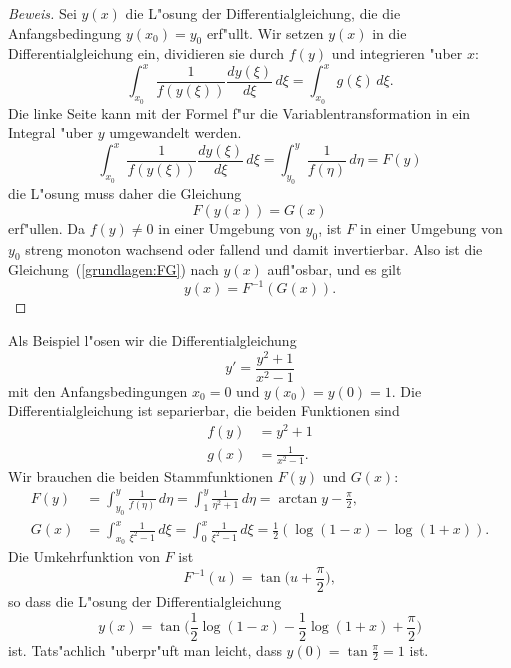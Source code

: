 \begin{proof}[Beweis]
Sei $y(x)$ die L"osung der Differentialgleichung, die die Anfangsbedingung
$y(x_0)=y_0$ erf"ullt.
Wir setzen $y(x)$ in die Differentialgleichung ein,
dividieren sie durch $f(y)$ und integrieren "uber $x$:
\[
\int_{x_0}^x\frac1{f(y(\xi))}\frac{dy(\xi)}{d\xi}\,d\xi
=
\int_{x_0}^x g(\xi)\,d\xi.
\]
Die linke Seite kann mit der Formel f"ur die Variablentransformation in
ein Integral "uber $y$ umgewandelt werden.
\[
\int_{x_0}^x\frac1{f(y(\xi))}\frac{dy(\xi)}{d\xi}\,d\xi
=
\int_{y_0}^y \frac1{f(\eta)}\,d\eta=F(y)
\]
die L"osung muss daher die Gleichung
\begin{equation}
F(y(x))=G(x)
\label{grundlagen:FG}
\end{equation}
erf"ullen.
Da $f(y)\ne 0$ in einer Umgebung von $y_0$, ist $F$ in einer Umgebung von $y_0$
streng monoton wachsend oder fallend und damit invertierbar.
Also ist die Gleichung~(\ref{grundlagen:FG}) nach $y(x)$ aufl"osbar, und
es gilt
\[
y(x)=F^{-1}(G(x)).
\]
\end{proof}

\begin{beispiel}
Als Beispiel l"osen wir die Differentialgleichung
\[
y'=\frac{y^2+1}{x^2-1}
\]
mit den Anfangsbedingungen $x_0=0$ und $y(x_0)=y(0)=1$.
Die Differentialgleichung ist separierbar, die beiden Funktionen sind
\begin{align*}
f(y)&=y^2+1
\\
g(x)&=\frac1{x^2-1}.
\end{align*}
Wir brauchen die beiden Stammfunktionen $F(y)$ und $G(x)$:
\begin{align*}
F(y)
&=
\int_{y_0}^y \frac1{f(\eta)}\,d\eta
=
\int_{1}^y \frac1{\eta^2+1}\,d\eta
=
\arctan y - \frac{\pi}2,
\\
G(x)
&=
\int_{x_0}^x\frac1{\xi^2-1}\,d\xi
=
\int_0^x \frac1{\xi^2-1}\,d\xi
=
\frac12(\log(1-x)-\log(1+x)).
\end{align*}
Die Umkehrfunktion von $F$ ist
\[
F^{-1}(u)=\tan\biggl(u+\frac{\pi}2\biggr),
\]
so dass die L"osung der Differentialgleichung
\[
y(x)=
\tan\biggl(\frac12\log(1-x)-\frac12\log(1+x)+\frac{\pi}2\biggr)
\]
ist.
Tats"achlich "uberpr"uft man leicht, dass $y(0)=\tan\frac{\pi}2=1$ ist.
\end{beispiel}

